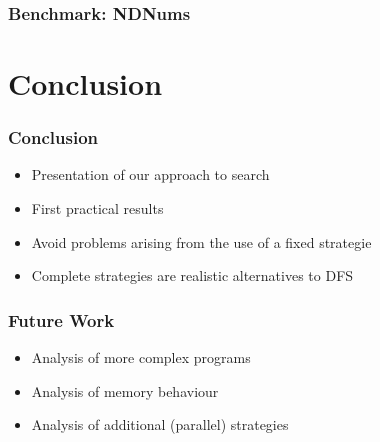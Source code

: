\documentclass[
,hyperref={pdfpagelabels=false}
]{beamer}
\newcommand{\todo}[1]{\fbox{\sc To do: #1}}
\begin{document}
\begin{frame}[fragile]%
\frametitle{Benchmark: NDNums}

\end{frame}

\section{Conclusion}

\begin{frame}[fragile]%
\frametitle{Conclusion}

\begin{itemize}
\item Presentation of our approach to search
\item First practical results
\item Avoid problems arising from the use of a fixed strategie
\item Complete strategies are realistic alternatives to DFS
\end{itemize}

\end{frame}

\begin{frame}[fragile]%
\frametitle{Future Work}

\begin{itemize}
\item Analysis of more complex programs
\item Analysis of memory behaviour
\item Analysis of additional (parallel) strategies
\end{itemize}

\end{frame}
\end{document}
